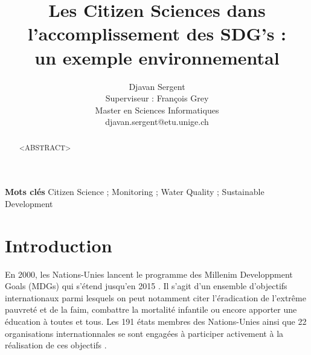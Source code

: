 \documentclass[10pt, article]{llncs}
\begin{document}
%
\title{Les Citizen Sciences dans\\l'accomplissement des SDG's : \\un exemple environnemental}



% 
\author{Djavan Sergent \\
Superviseur : François Grey\\
Master en Sciences Informatiques \\
djavan.sergent@etu.unige.ch}




\maketitle

\begin{abstract}
	<ABSTRACT>
\end{abstract}


\textbf{Mots clés} Citizen Science ; Monitoring ; Water Quality ; Sustainable Development

\pagebreak

\section{Introduction}
	En 2000, les Nations-Unies lancent le programme des Millenim Developpment Goals (MDGs) qui s'étend jusqu'en 2015 \cite{united_nations_millennium_2009}. Il s'agit d'un ensemble d'objectifs internationaux parmi lesquels on peut notamment citer l'éradication de l'extrême pauvreté et de la faim, combattre la mortalité infantile ou encore apporter une éducation à toutes et tous. Les 191 états membres des Nations-Unies ainsi que 22 organisations internationnales se sont engagées à participer activement à la réalisation de ces objectifs \cite{wikipedia_millennium_2017}.
	
\end{document}
